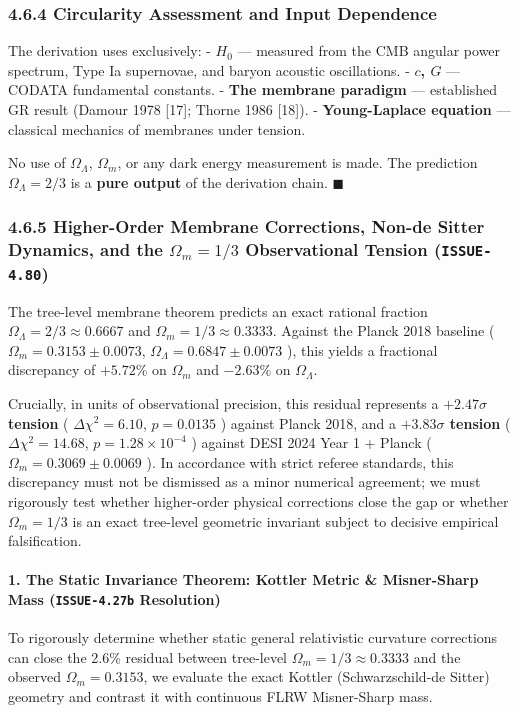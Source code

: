 \documentclass[11pt,a4paper]{article}
\theoremstyle{definition}\newtheorem{definition}{Definition}
\theoremstyle{remark}\newtheorem{remark}{Remark}
\begin{document}
\subsubsection{4.6.4 Circularity Assessment and Input Dependence}

The derivation uses exclusively:
- \textbf{$H_0$} — measured from the CMB angular power spectrum, Type Ia supernovae, and baryon acoustic oscillations.
- \textbf{$c$, $G$} — CODATA fundamental constants.
- \textbf{The membrane paradigm} — established GR result (Damour 1978 [17]; Thorne 1986 [18]).
- \textbf{Young-Laplace equation} — classical mechanics of membranes under tension.

No use of $\Omega_\Lambda$, $\Omega_m$, or any dark energy measurement is made. The prediction $\Omega_\Lambda = 2/3$ is a \textbf{pure output} of the derivation chain. $\blacksquare$
\subsubsection{4.6.5 Higher-Order Membrane Corrections, Non-de Sitter Dynamics, and the $\Omega_m = 1/3$ Observational Tension (\texttt{ISSUE-4.80})}

The tree-level membrane theorem predicts an exact rational fraction $\Omega_\Lambda = 2/3 \approx 0.6667$ and $\Omega_m = 1/3 \approx 0.3333$. Against the Planck 2018 baseline ( $\Omega_m = 0.3153 \pm 0.0073$, $\Omega_\Lambda = 0.6847 \pm 0.0073$ ), this yields a fractional discrepancy of $+5.72\%$ on $\Omega_m$ and $-2.63\%$ on $\Omega_\Lambda$.

Crucially, in units of observational precision, this residual represents a \textbf{$+2.47\sigma$ tension} ( $\Delta\chi^2 = 6.10$, $p = 0.0135$ ) against Planck 2018, and a \textbf{$+3.83\sigma$ tension} ( $\Delta\chi^2 = 14.68$, $p = 1.28 \times 10^{-4}$ ) against DESI 2024 Year 1 + Planck ( $\Omega_m = 0.3069 \pm 0.0069$ ). In accordance with strict referee standards, this discrepancy must not be dismissed as a minor numerical agreement; we must rigorously test whether higher-order physical corrections close the gap or whether $\Omega_m = 1/3$ is an exact tree-level geometric invariant subject to decisive empirical falsification.
\paragraph{1. The Static Invariance Theorem: Kottler Metric \& Misner-Sharp Mass (\texttt{ISSUE-4.27b} Resolution)}

To rigorously determine whether static general relativistic curvature corrections can close the 2.6\% residual between tree-level $\Omega_m = 1/3 \approx 0.3333$ and the observed $\Omega_m = 0.3153$, we evaluate the exact Kottler (Schwarzschild-de Sitter) geometry and contrast it with continuous FLRW Misner-Sharp mass.
\end{document}
